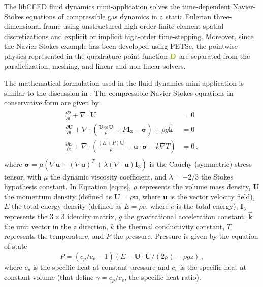 The libCEED \cite{libceed-user-manual} fluid dynamics mini-application solves the time-dependent Navier-Stokes equations of compressible gas dynamics in a static Eulerian three-dimensional frame using unstructured high-order finite element spatial discretizations and explicit or implicit high-order time-stepping.
Moreover, since the Navier-Stokes example has been developed using PETSc, the pointwise physics represented in the quadrature point function ${\color{applegreen}\mathbf{D}}$ are separated from the parallelization, meshing, and linear and non-linear solvers.

The mathematical formulation used in the fluid dynamics mini-application is similar to the discussion in \cite{giraldoetal2010}.
The compressible Navier-Stokes equations in conservative form are given by
\begin{equation}
   \begin{aligned}
   \frac{\partial \rho}{\partial t} + \nabla \cdot \mathbf{U} &= 0 \\
   \frac{\partial \mathbf{U}}{\partial t} + \nabla \cdot \left( \frac{\mathbf{U} \otimes \mathbf{U}}{\rho} + P \mathbf{I}_3 - \mathbf\sigma \right) + \rho g \hat{\mathbf{k}} &= 0 \\
   \frac{\partial E}{\partial t} + \nabla \cdot \left( \frac{(E + P)\mathbf{U}}{\rho} -\mathbf{u} \cdot \mathbf{\sigma} - k \nabla T \right) &= 0 \, , \\
   \end{aligned}
\label{eq:ns}
\end{equation}
where $\boldsymbol{\sigma} = \mu \left( \nabla \mathbf{u} + \left( \nabla \mathbf{u} \right)^T + \lambda \left( \nabla \cdot \mathbf{u} \right) \mathbf{I}_3 \right)$ is the Cauchy (symmetric) stress tensor, with $\mu$ the dynamic viscosity coefficient, and $\lambda = - 2/3$ the Stokes hypothesis constant.
In Equation \ref{eq:ns}, $\rho$ represents the volume mass density, $\mathbf{U}$ the momentum density (defined as $\mathbf{U} = \rho \mathbf{u}$, where $\mathbf{u}$ is the vector velocity field), $E$ the total energy density (defined as $E = \rho e$, where $e$ is the total energy), $\mathbf{I}_3$ represents the $3 \times 3$ identity matrix, $g$ the gravitational acceleration constant, $\mathbf{\hat{k}}$ the unit vector in the $z$ direction, $k$ the thermal conductivity constant, $T$ represents the temperature, and $P$ the pressure.
Pressure is given by the equation of state
\begin{equation}
   P = \left( {c_p}/{c_v} -1\right) \left( E - {\mathbf{U} \cdot \mathbf{U}}/{(2 \rho)} - \rho g z \right) \, ,
   \label{eq:ns_state}
\end{equation}
where $c_p$ is the specific heat at constant pressure and $c_v$ is the specific heat at constant volume (that define $\gamma = c_p / c_v$, the specific heat ratio).

